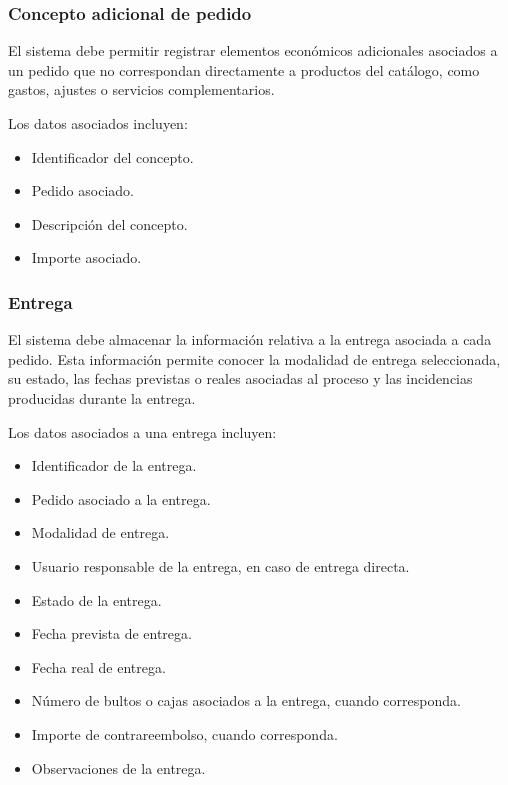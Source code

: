 \subsubsection*{Concepto adicional de pedido}

El sistema debe permitir registrar elementos económicos adicionales asociados a un pedido que no correspondan directamente a productos del catálogo, como gastos, ajustes o servicios complementarios.

Los datos asociados incluyen:

\begin{itemize}
    \item Identificador del concepto.
    \item Pedido asociado.
    \item Descripción del concepto.
    \item Importe asociado.
\end{itemize}

\subsubsection*{Entrega}

El sistema debe almacenar la información relativa a la entrega asociada a cada pedido. Esta información permite conocer la modalidad de entrega seleccionada, su estado, las fechas previstas o reales asociadas al proceso y las incidencias producidas durante la entrega.

Los datos asociados a una entrega incluyen:

\begin{itemize}
    \item Identificador de la entrega.
    \item Pedido asociado a la entrega.
    \item Modalidad de entrega.
    \item Usuario responsable de la entrega, en caso de entrega directa.
    \item Estado de la entrega.
    \item Fecha prevista de entrega.
    \item Fecha real de entrega.
    \item Número de bultos o cajas asociados a la entrega, cuando corresponda.
    \item Importe de contrareembolso, cuando corresponda.
    \item Observaciones de la entrega.
\end{itemize}

